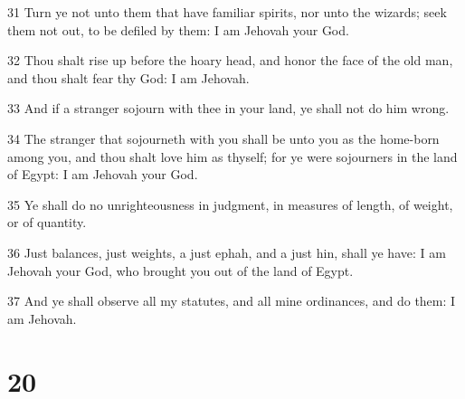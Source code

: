 \par 31 Turn ye not unto them that have familiar spirits, nor unto the wizards; seek them not out, to be defiled by them: I am Jehovah your God.
\par 32 Thou shalt rise up before the hoary head, and honor the face of the old man, and thou shalt fear thy God: I am Jehovah.
\par 33 And if a stranger sojourn with thee in your land, ye shall not do him wrong.
\par 34 The stranger that sojourneth with you shall be unto you as the home-born among you, and thou shalt love him as thyself; for ye were sojourners in the land of Egypt: I am Jehovah your God.
\par 35 Ye shall do no unrighteousness in judgment, in measures of length, of weight, or of quantity.
\par 36 Just balances, just weights, a just ephah, and a just hin, shall ye have: I am Jehovah your God, who brought you out of the land of Egypt.
\par 37 And ye shall observe all my statutes, and all mine ordinances, and do them: I am Jehovah.

\chapter{20}

